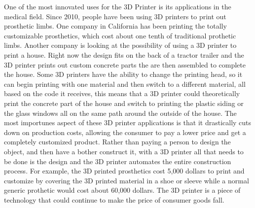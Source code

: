\documentclass[12pt,twocolumn]{article}
\begin{document}
\indent	One of the most innovated uses for the 3D Printer is its applications in the medical field. Since 2010, people have been using 3D printers to print out prosthetic limbs. One company in California has been printing the totally customizable prosthetics, which cost about one tenth of traditional prothetic limbs. Another company is looking at the possibility of using a 3D printer to print a house. Right now the design fits on the back of a tractor trailer and the 3D printer prints out custom concrete parts the are then assembled to complete the house. Some 3D printers have the ability to change the printing head, so it can begin printing with one material and then switch to a different material, all based on the code it receives, this means that a 3D printer could theoretically print the concrete part of the house and switch to printing the plastic siding or the glass windows all on the same path around the outside of the house. The most importunes aspect of these 3D printer applications is that it drastically cuts down on production costs, allowing the consumer to pay a lower price and get a completely customized product. Rather than paying a person to design the object, and then have a bother construct it, with a 3D printer all that needs to be done is the design and the 3D printer automates the entire construction process. For example, the 3D printed prosthetics cost 5,000 dollars to print and customize by covering the 3D printed material in a shoe or sleeve while a normal generic prothetic would cost about 60,000 dollars. \cite{cite5} The 3D printer is a piece of technology that could continue to make the price of consumer goods fall.
\end{document}
